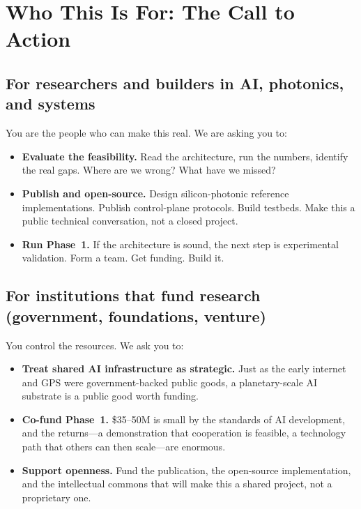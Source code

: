 \documentclass[12pt]{article}
\begin{document}
\section{Who This Is For: The Call to Action}
\label{sec:calls}

\subsection{For researchers and builders in AI, photonics, and systems}

You are the people who can make this real. We are asking you to:
\begin{itemize}[leftmargin=1.6em,itemsep=2pt]
  \item \textbf{Evaluate the feasibility.} Read the architecture, run the
  numbers, identify the real gaps. Where are we wrong? What have we missed?
  \item \textbf{Publish and open-source.} Design silicon-photonic reference
  implementations. Publish control-plane protocols. Build testbeds. Make this a
  public technical conversation, not a closed project.
  \item \textbf{Run Phase~1.} If the architecture is sound, the next step is
  experimental validation. Form a team. Get funding. Build it.
\end{itemize}

\subsection{For institutions that fund research (government, foundations, venture)}

You control the resources. We ask you to:
\begin{itemize}[leftmargin=1.6em,itemsep=2pt]
  \item \textbf{Treat shared AI infrastructure as strategic.} Just as the early
  internet and GPS were government-backed public goods, a planetary-scale AI
  substrate is a public good worth funding.
  \item \textbf{Co-fund Phase~1.} \$35--50M is small by the standards of AI
  development, and the returns---a demonstration that cooperation is feasible, a
  technology path that others can then scale---are enormous.
  \item \textbf{Support openness.} Fund the publication, the open-source
  implementation, and the intellectual commons that will make this a shared
  project, not a proprietary one.
\end{itemize}
\end{document}
